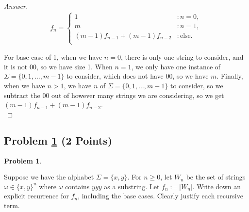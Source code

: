 \documentclass[11pt]{article}
\theoremstyle{definition}
\theoremstyle{definition}
\newtheorem{required}{Problem}
\theoremstyle{definition}
\begin{document}
\begin{proof}[Answer]
\begin{align*}
	f_n = \begin{cases}
		1 & : n = 0, \\
		m & : n = 1, \\
		(m - 1) f_{n - 1} + (m - 1)f_{n - 2} &: \text{else}.\\
	\end{cases}
\end{align*}

For base case of 1, when we have $n = 0$, there is only one string to consider, and it is not 00, so we have size 1. When $n = 1$, we only have one instance of $\Sigma = \{0, 1, \ldots, m-1\}$ to consider, which does not have 00, so we have $m$. Finally, when we have $n > 1$, we have $n$ of $\Sigma = \{0, 1, \ldots, m-1\}$ to consider, so we subtract the 00 out of however many strings we are considering, so we get $(m - 1) f_{n - 1} + (m - 1)f_{n - 2}$.\\
\end{proof}

\newpage
\subsection{Problem \ref{DP2} (2 Points)}
\begin{required} \label{DP2}

Suppose we have the alphabet $\Sigma = \{x, y\}$. For $n \geq 0$, let $W_{n}$ be the set of strings $\omega \in \{x, y\}^{n}$ where $\omega$ contains $yyy$ as a substring. Let $f_{n} := |W_{n}|$. Write down an explicit recurrence for $f_{n}$, including the base cases. Clearly justify each recursive term.
\end{required}
\end{document}
